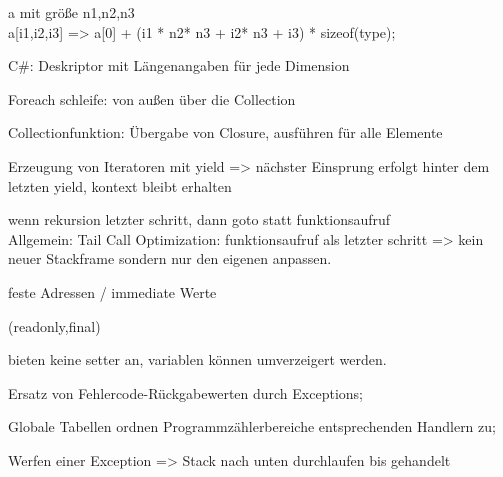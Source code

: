 %


 a mit größe n1,n2,n3 \\
a[i1,i2,i3] =>  a[0] + (i1 * n2* n3 + i2* n3 + i3) * sizeof(type);

C\#: Deskriptor mit Längenangaben für jede Dimension

Foreach schleife: von außen über die Collection

 Collectionfunktion: Übergabe von Closure, ausführen für alle Elemente

Erzeugung von Iteratoren mit yield => nächster Einsprung erfolgt hinter dem letzten yield, kontext bleibt erhalten

 wenn rekursion letzter schritt, dann goto statt funktionsaufruf\\
Allgemein: Tail Call Optimization: funktionsaufruf als letzter schritt => kein neuer Stackframe sondern nur den eigenen anpassen.



 feste Adressen / immediate Werte

 (readonly,final)

 bieten keine setter an, variablen können umverzeigert werden.

Ersatz von Fehlercode-Rückgabewerten durch Exceptions;

Globale Tabellen ordnen Programmzählerbereiche entsprechenden Handlern zu; 

 Werfen einer Exception => Stack nach unten durchlaufen bis gehandelt


